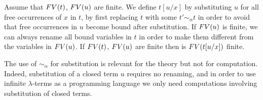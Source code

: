 %
%
%
%
%




Assume that ${{\relax FV}}(t)$, ${{\relax FV}}(u)$ are finite. 
We define $t[u/x]$ by substituting $u$ for all free occurrences of $x$ in $t$, 
by first replacing $t$ with some $t' \sim_\alpha t$
in order to avoid that free occurrences in $u$ become bound after substitution. 
If ${{\relax FV}}(u)$ is finite, we can always
rename all bound variables in $t$ in order to make them different from the variables
in ${{\relax FV}}(u)$. If ${{\relax FV}}(t)$, ${{\relax FV}}(u)$ are finite then is ${{\relax FV}}(t[u/x])$ finite.

The use of $\sim_\alpha$ for substitution is relevant for the theory but not
for computation. Indeed,
substitution of a closed term $u$ requires no renaming, and  in order to use 
infinite $\lambda$-terms as a programming language we only need computations 
involving substitution of closed terms. 

